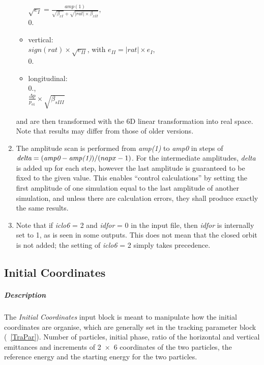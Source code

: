 \begin{enumerate}
\begin{itemize}
  $\sqrt{e_I}=\frac{amp(1)}
  {\sqrt{\beta_{xI}}+\sqrt{\left|rat\right|\times\beta_{xII}}}$,\\

  $0.$

\item vertical: \\

 $sign(rat)\times \sqrt{e_{II}}$, with $e_{II} =
 \left|rat\right|\times e_{I}$,\\

 $0.$

\item longitudinal: \\

$0.$,\\ 

$\frac{\Delta p}{p_{o1}} \times \sqrt{\beta_{sIII}}$

\end{itemize}
and are then transformed with the 6D linear transformation into real
space. Note that results may differ from those of older versions.

\item The amplitude scan is performed from \emph{amp(1)} to \emph{amp0} in steps of $\emph{delta} = (\emph{amp0} - \emph{amp(1)}) / (napx-1)$.
For the intermediate amplitudes, \emph{delta} is added up for each step, however the last amplitude is guaranteed to be fixed to the given value.
This enables ``control calculations'' by setting the first amplitude of one simulation equal to the last amplitude of another simulation, and unless there are calculation errors, they shall produce exactly the same results.

\item Note that if \emph{iclo6} = 2 and \emph{idfor} = 0 in the input file, then \emph{idfor} is internally set to 1, as is seen in some outputs.
This does not mean that the closed orbit is not added; the setting of \emph{iclo6} = 2 simply takes precedence.

\end{enumerate}

\subsection{Initial Coordinates} \label{IniCoo}

\subparagraph{Description} The {\em Initial Coordinates} \/input block
is meant to manipulate how the initial coordinates are organise, which
are generally set in the tracking parameter block (~\ref{TraPar}).
Number of particles, initial phase, ratio of the horizontal and
vertical emittances and increments of \mbox{2 $\times$ 6} coordinates
of the two particles, the reference energy and the starting energy for
the two particles.

